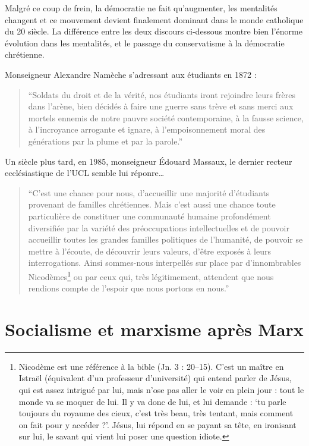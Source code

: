 \documentclass[12pt]{report}
\begin{document}
Malgré ce coup de frein, la démocratie ne fait qu'augmenter, les mentalités changent et ce mouvement
devient finalement dominant dans le monde catholique du 20 siècle.
La différence entre les deux discours ci-dessous montre bien l'énorme évolution dans les mentalités, et le passage du conservatisme à la démocratie chrétienne.

Monseigneur Alexandre Namèche s'adressant aux étudiants en 1872 :
\begin{quote}
	\enquote{Soldats du droit et de la vérité, nos étudiants iront rejoindre leurs frères dans l'arène, bien décidés à faire une guerre sans trève et sans merci aux mortels ennemis de notre pauvre société contemporaine, à la fausse science, à l'incroyance arrogante et ignare, à l'empoisonnement moral des générations par la plume et par la parole.}
\end{quote}

Un siècle plus tard, en 1985, monseigneur Édouard Massaux, le dernier recteur ecclésiastique de l'UCL semble lui réponre…
\begin{quote}
	\enquote{C'est une chance pour nous, d'accueillir une majorité d'étudiants provenant de familles chrétiennes. Mais c'est aussi une chance toute particulière de constituer une communauté humaine profondément diversifiée par la variété des préoccupations intellectuelles et de pouvoir accueillir toutes les grandes familles politiques de l'humanité, de pouvoir se mettre à l'écoute, de découvrir leurs valeurs, d'être exposés à leurs interrogations. Ainsi sommes-nous interpellés sur place par d'innombrables Nicodèmes\footnote{Nicodème est une référence à la bible (Jn. 3 : 20--15). C'est un maître en Istraël (équivalent d'un professeur d'université) qui entend parler de Jésus, qui est assez intrigué par lui, mais n'ose pas aller le voir en plein jour : tout le monde va se moquer de lui. Il y va donc de lui, et lui demande : \enquote{tu parle toujours du royaume des cieux, c'est très beau, très tentant, mais comment on fait pour y accéder ?}. Jésus, lui répond en se payant sa tête, en ironisant sur lui, le savant qui vient lui poser une question idiote.} ou par ceux qui, très légitimement, attendent que nous rendions compte de l'espoir que nous portons en nous.}
\end{quote}

\section{Socialisme et marxisme après Marx}
\end{document}
